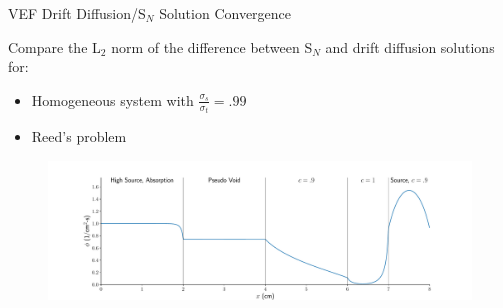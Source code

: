 \documentclass[10pt]{beamer}
\newcommand{\SN}{S$_N$\xspace}
\begin{document}
\begin{frame}{VEF Drift Diffusion/\SN Solution Convergence}

	Compare the L$_2$ norm of the difference between \SN and drift diffusion solutions for:
	\begin{itemize} 

		\item Homogeneous system with $\frac{\sigma_s}{\sigma_t} = .99$ 

		\item Reed's problem 

	\end{itemize}

	\begin{figure}
		\centering
		\includegraphics[width=\textwidth]{figs/reed_solution.pdf}
	\end{figure}

\end{frame}
\end{document}
